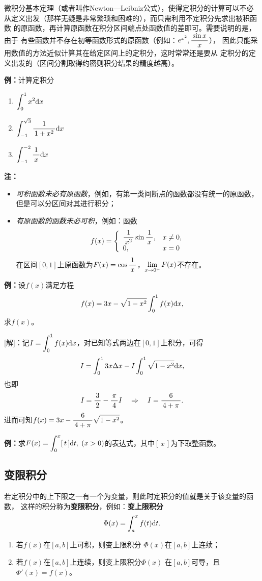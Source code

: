 微积分基本定理（或者叫作Newton—Leibniz公式），使得定积分的计算可以不必
从定义出发（那样无疑是非常繁琐和困难的），而只需利用不定积分先求出被积函数
的原函数，再计算原函数在积分区间端点处函数值的差即可。需要说明的是，由于
有些函数并不存在初等函数形式的原函数（例如：$e^{x^2},\displaystyle\frac{\,{\sin x}\,}{\,{x}\,}$），
因此只能采用数值的方法近似计算其在给定区间上的定积分，这时常常还是要从
定积分的定义出发的（区间分割取得约密则积分结果的精度越高）。

{\bf 例：}计算定积分
\begin{enumerate}[(1)]
  \setlength{\itemindent}{1cm}
  \item $\displaystyle\int_{0}^{1}x^2 \mathrm{d} x$
  \item $\displaystyle\int_{-1}^{\sqrt 3}\displaystyle\frac{\,{1}\,}{\,{1+x^2}\,}\mathrm{d} x$
  \item $\displaystyle\int_{-1}^{-2}\displaystyle\frac{\,{1}\,}{\,{x}\,}\mathrm{d} x$
\end{enumerate}

{\bf 注：}
\begin{itemize}
  \setlength{\itemindent}{1cm}
  \item {\it 可积函数未必有原函数}，例如，有第一类间断点的函数都没有统一的原函数，
  但是可以分区间对其进行积分；
  \item {\it 有原函数的函数未必可积}，例如：函数
  $$f(x)=\left\{\begin{array}{ll}
  \displaystyle\frac{\,{1}\,}{\,{x^2}\,}\sin\displaystyle\frac{\,{1}\,}{\,{x}\,},& x\ne0,\\ 0,& x=0
  \end{array}\right.$$
  在区间$[0,1]$上原函数为$F(x)=\cos\displaystyle\frac{\,{1}\,}{\,{x}\,}$，$\lim\limits_{x\to{0^+}}F(x)$不存在。
\end{itemize}

{\bf 例：}设$f(x)$满足方程
$$f(x)=3x-\sqrt{1-x^2}\displaystyle\int_0^1f(x)\mathrm{d} x,$$
求$f(x)$。

[解]：记$I=\displaystyle\int_0^1f(x)\mathrm{d} x$，对已知等式两边在$[0,1]$上积分，可得
$$I=\displaystyle\int_0^13x\Delta x-I\displaystyle\int_0^1\sqrt{1-x^2}\mathrm{d} x,$$
也即
$$I=\displaystyle\frac{\,{3}\,}{\,{2}\,}-\displaystyle\frac{\,{\pi}\,}{\,{4}\,}I
\quad\Rightarrow\quad
I=\displaystyle\frac{\,{6}\,}{\,{4+\pi}\,}.$$
进而可知$f(x)=3x-\displaystyle\frac{\,{6}\,}{\,{4+\pi}\,}\sqrt{1-x^2}$。\fin

{\bf 例：}求$F(x)=\displaystyle\int_0^x[\,t\,]\mathrm{d} t,\;(x>0)$的表达式，其中$[\,x\,]$为下取整函数。

\subsection{变限积分}

若定积分中的上下限之一有一个为变量，则此时定积分的值就是关于该变量的函数，
这样的积分称为{\bf 变限积分}，例如：{\bf 变上限积分}
$$\Phi(x)=\displaystyle\int_a^xf(t)\mathrm{d} t.$$

\begin{thx}
	\begin{enumerate}
	  \item 若$f(x)$在$[a,b]$上可积，则变上限积分
		$\Phi(x)$在$[a,b]$上连续；
	  \item 若$f(x)$在$[a,b]$上连续，则变上限积分$\Phi(x)$
	    在$[a,b]$可导，且$\Phi'(x)=f(x)$。
	\end{enumerate}
\end{thx}

